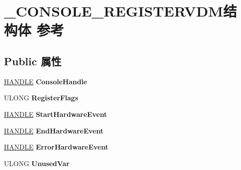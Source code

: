\hypertarget{struct___c_o_n_s_o_l_e___r_e_g_i_s_t_e_r_v_d_m}{}\section{\+\_\+\+C\+O\+N\+S\+O\+L\+E\+\_\+\+R\+E\+G\+I\+S\+T\+E\+R\+V\+D\+M结构体 参考}
\label{struct___c_o_n_s_o_l_e___r_e_g_i_s_t_e_r_v_d_m}
\subsection*{Public 属性}
\begin{DoxyCompactItemize}
\item 
\mbox{\label{struct___c_o_n_s_o_l_e___r_e_g_i_s_t_e_r_v_d_m_abdd62490db22a17eff0baf5fd84dae48}} 
\hyperlink{interfacevoid}{H\+A\+N\+D\+LE} {\bfseries Console\+Handle}
\item 
\mbox{\label{struct___c_o_n_s_o_l_e___r_e_g_i_s_t_e_r_v_d_m_aa22c7fc1c184682cf2e5db9d05b8a273}} 
U\+L\+O\+NG {\bfseries Register\+Flags}
\item 
\mbox{\label{struct___c_o_n_s_o_l_e___r_e_g_i_s_t_e_r_v_d_m_aee090522ee15dec23c881409a3923df4}} 
\hyperlink{interfacevoid}{H\+A\+N\+D\+LE} {\bfseries Start\+Hardware\+Event}
\item 
\mbox{\label{struct___c_o_n_s_o_l_e___r_e_g_i_s_t_e_r_v_d_m_a217ef168b21750281eced9fbc68eab27}} 
\hyperlink{interfacevoid}{H\+A\+N\+D\+LE} {\bfseries End\+Hardware\+Event}
\item 
\mbox{\label{struct___c_o_n_s_o_l_e___r_e_g_i_s_t_e_r_v_d_m_a62862ee4394d045968504ed863007a77}} 
\hyperlink{interfacevoid}{H\+A\+N\+D\+LE} {\bfseries Error\+Hardware\+Event}
\item 
\mbox{\label{struct___c_o_n_s_o_l_e___r_e_g_i_s_t_e_r_v_d_m_aa200087230668dca0c381525a30663e7}} 
U\+L\+O\+NG {\bfseries Unused\+Var}
\item 

\end{DoxyCompactItemize}
